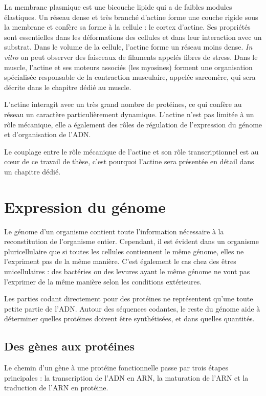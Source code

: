 La membrane plasmique est une bicouche lipide qui a de faibles modules élastiques. Un réseau dense et très branché d'actine forme une couche rigide sous la membrane et confère sa forme à la cellule : le cortex d'actine. Ses propriétés sont essentielles dans les déformations des cellules et dans leur interaction avec un substrat. 
Dans le volume de la cellule, l'actine forme un réseau moins dense. \textit{In vitro} on peut observer des faisceaux de filaments appelés fibres de stress. 
Dans le muscle, l'actine et ses moteurs associés (les myosines) forment une organisation spécialisée responsable de la contraction musculaire, appelée sarcomère, qui sera décrite dans le chapitre dédié au muscle.

L'actine interagit avec un très grand nombre de protéines, ce qui confère au réseau un caractère particulièrement dynamique. L'actine n'est pas limitée à un rôle mécanique, elle a également des rôles de régulation de l'expression du génome et d'organisation de l'ADN. 

Le couplage entre le rôle mécanique de l'actine et son rôle transcriptionnel est au c\oe ur de ce travail de thèse, c'est pourquoi l'actine sera présentée en détail dans un chapitre dédié. 




\section{Expression du génome}

Le génome d'un organisme contient toute l'information nécessaire à la reconstitution de l'organisme entier. Cependant, il est évident dans un organisme pluricellulaire que si toutes les cellules contiennent le même génome, elles ne l'expriment pas de la même manière. C'est également le cas chez des êtres unicellulaires : des bactéries ou des levures ayant le même génome ne vont pas l'exprimer de la même manière selon les conditions extérieures. 

Les parties codant directement pour des protéines ne représentent qu'une toute petite partie de l'ADN. Autour des séquences codantes, le reste du génome aide à déterminer quelles protéines doivent être synthétisées, et dans quelles quantités. 

\subsection{Des gènes aux protéines}

Le chemin d'un gène à une protéine fonctionnelle passe par trois étapes principales : la transcription de l'ADN en ARN, la maturation de l'ARN et la traduction de l'ARN en protéine.

